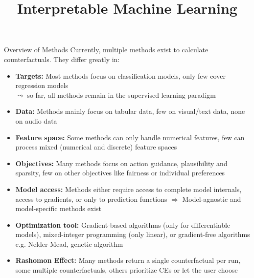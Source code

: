 \documentclass[11pt,compress,t,notes=noshow, aspectratio=169, xcolor=table]{beamer}
\title{Interpretable Machine Learning}
\date{}
\begin{document}
	
	
	
	
	
	
	\newcommand{\titlefigure}{figure/counterfactuals_heat.png}
    \newcommand{\learninggoals}{
    	\item See two strategies to generate CEs
    	\item Know problems and limitations of CEs}
	
	


\begin{frame}{Overview of Methods}
	Currently, multiple methods exist to calculate counterfactuals. They differ greatly in: 
	\begin{itemize}[<+->]
		\item \textbf{Targets:} Most methods focus on classification models, only few cover regression models\\
		$\leadsto$ so far, all methods remain in the supervised learning paradigm
		\item \textbf{Data:} Methods mainly focus on tabular data, few on visual/text data, none on audio data
		\item \textbf{Feature space:} Some methods can only handle numerical features, few can process mixed (numerical and discrete) feature spaces
		\item \textbf{Objectives:} Many methods focus on action guidance, plausibility and sparsity, few on other objectives like fairness or individual preferences
		\item \textbf{Model access:} Methods either require access to complete model internals, access to gradients, or only to prediction functions $\Rightarrow$ Model-agnostic and model-specific methods exist
		\item \textbf{Optimization tool:} Gradient-based algorithms (only for differentiable models), mixed-integer programming (only linear), or gradient-free algorithms e.g. Nelder-Mead, genetic algorithm
		\item \textbf{Rashomon Effect:} Many methods return a single counterfactual per run, some multiple counterfactuals, others prioritize CEs or let the user choose
	\end{itemize}
\end{frame}
\end{document}
